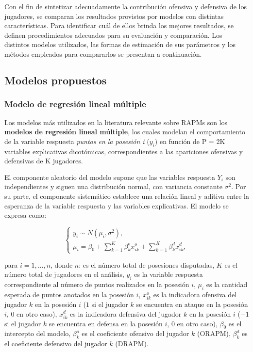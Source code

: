 \documentclass[
  12pt,
]{article}
\begin{document}
Con el fin de sintetizar adecuadamente la contribución ofensiva y
defensiva de los jugadores, se comparan los resultados provistos por
modelos con distintas características. Para identificar cuál de ellos
brinda los mejores resultados, se definen procedimientos adecuados para
su evaluación y comparación. Los distintos modelos utilizados, las
formas de estimación de sus parámetros y los métodos empleados para
compararlos se presentan a continuación.

\subsection{Modelos propuestos}\label{modelos-propuestos}

\subsubsection{Modelo de regresión lineal
múltiple}\label{modelo-de-regresiuxf3n-lineal-muxfaltiple}

Los modelos más utilizados en la literatura relevante sobre RAPMs son
los \textbf{modelos de regresión lineal múltiple}, los cuales modelan el
comportamiento de la variable respuesta \emph{puntos en la posesión i}
(\(y_i\)) en función de P = 2K variables explicativas dicotómicas,
correspondientes a las apariciones ofensivas y defensivas de K
jugadores.

El componente aleatorio del modelo supone que las variables respuesta
\(Y_i\) son independientes y siguen una distribución normal, con
variancia constante \(\sigma^2\). Por su parte, el componente
sistemático establece una relación lineal y aditiva entre la esperanza
de la variable respuesta y las variables explicativas. El modelo se
expresa como:

\begin{equation}
\begin{cases}
y_i \sim N(\mu_i  , \sigma^2), \\
\mu_i = \beta_0 + \sum_{k=1}^{K} \beta^o_k x^o_{ik} + \sum_{k=1}^{K} \beta^d_k x^d_{ik},
\end{cases}
\end{equation}

para \(i = 1,...,n\), donde \(n\): es el número total de posesiones
disputadas, \(K\) es el número total de jugadores en el análisis,
\(y_i\) es la variable respuesta correspondiente al número de puntos
realizados en la posesión \(i\), \(\mu_i\) es la cantidad esperada de
puntos anotados en la posesión \(i\), \(x^o_{ik}\) es la indicadora
ofensiva del jugador \(k\) en la posesión \(i\) (\(1\) si el jugador
\(k\) se encuentra en ataque en la posesión \(i\), \(0\) en otro caso),
\(x^d_{ik}\) es la indicadora defensiva del jugador \(k\) en la posesión
\(i\) (\(-1\) si el jugador \(k\) se encuentra en defensa en la posesión
\(i\), \(0\) en otro caso), \(\beta_0\) es el intercepto del modelo,
\(\beta^o_k\) es el coeficiente ofensivo del jugador \(k\) (ORAPM),
\(\beta^d_k\) es el coeficiente defensivo del jugador \(k\) (DRAPM).
\end{document}
